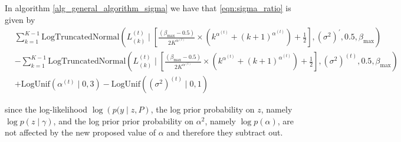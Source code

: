 \documentclass[11pt]{amsart}
\begin{document}
In algorithm \eqref{alg_general_algorithm_sigma} we have that \eqref{eqn:sigma_ratio} is given by
\begin{align}
& \sum_{k=1}^{K-1} \text{LogTruncatedNormal} \left(L_{(k)}^{(t)} \mid  \left[ \frac{(\beta_{\max} - 0.5)}{2K^{\alpha^{(t)}}} \times  \left(  k^{\alpha^{(t)}} + (k+1)^{\alpha^{(t)}} \right) +\frac{1}{2} \right], (\sigma^{2})^{\prime}, 0.5, \beta_{\max}\right) \nonumber \\ 
&- \sum_{k=1}^{K-1} \text{LogTruncatedNormal}\left(L_{(k)}^{(t)} \mid \left[ \frac{(\beta_{\max} - 0.5)}{2K^{\alpha^{(t)}}} \times  \left(  k^{\alpha^{(t)}} + (k+1)^{\alpha^{(t)}} \right) +\frac{1}{2} \right], (\sigma^{2})^{(t)}, 0.5, \beta_{\max} \right) \nonumber \\  
&+ \text{LogUnif}\left(\alpha^{(t)} \mid 0, 3\right) - \text{LogUnif}\left((\sigma^{2})^{(t)} \mid 0, 1\right) 
\end{align}

since the log-likelihood $\log{\left(p(y\mid z,P\right)}$, the log prior probability on $z$, namely $\log{p\left(z \mid \gamma \right)}$, and the log prior prior probability on $\alpha^2$, namely $\log{p\left(\alpha \right)}$, are not affected by the new proposed value of $\alpha$ and therefore they subtract out.
\end{document}
